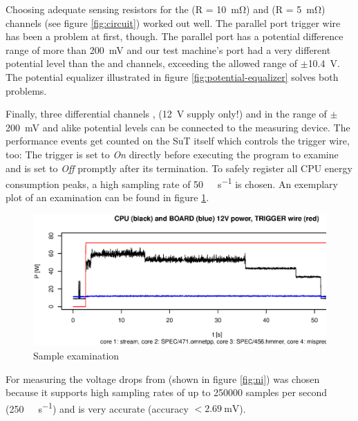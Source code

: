 Choosing adequate sensing resistors for the  (R =
\SI{10}{\milli\ohm}) and  (R = \SI{5}{\milli\ohm}) channels (see
figure \ref{fig:circuit}) worked out well. The parallel port trigger wire has
been a problem at first, though. The parallel port has a potential difference
range of more than \SI{200}{\milli\volt} and our test machine's port had a very
different potential level than the  and  channels,
exceeding the allowed range of $\pm$\SI{10.4}{\volt}.  The potential equalizer
illustrated in figure \ref{fig:potential-equalizer} solves both problems.

Finally, three differential channels , 
(\SI{12}{\volt} supply only!) and  in the range of
$\pm$\SI{200}{\milli\volt} and alike potential levels can be connected to the
measuring device. The performance events get counted on the SuT itself which
controls the trigger wire, too: The trigger is set to \emph{On} directly before
executing the program to examine and is set to \emph{Off} promptly after its
termination. To safely register all CPU energy consumption peaks, a high
sampling rate of \SI{50}{\kilo\samples\per\second} is chosen. An exemplary
plot of an examination can be found in figure \ref{fig:cpu-power-trig}.

\begin{figure}
  \centering
    \includegraphics[width=\textwidth]{fig/cpu-power-trig.eps}
  \caption{Sample examination}
  \label{fig:cpu-power-trig}
\end{figure}



\label{sec:measuring-device}

For measuring the voltage drops \JWPLni{} from
 (shown in figure
\ref{fig:ni}) was chosen because it supports high sampling rates of up to 250000
samples per second (\SI{250}{\kilo\samples\per\second}) and is very accurate
(accuracy $< \SI{2.69}{\milli\volt}$)\cite{NISpec2009}.

